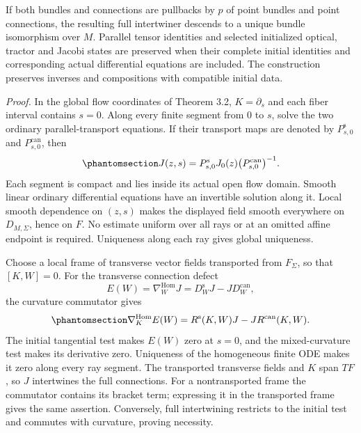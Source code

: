 \documentclass[
  english,
  11pt,
  reqno]{amsart}
\begin{document}
If both bundles and connections are pullbacks by \(p\) of point bundles
and point connections, the resulting full intertwiner descends to a
unique bundle isomorphism over \(M\). Parallel tensor identities and
selected initialized optical, tractor and Jacobi states are preserved
when their complete initial identities and corresponding actual
differential equations are included. The construction preserves inverses
and compositions with compatible initial data.

\emph{Proof.} In the global flow coordinates of Theorem 3.2,
\(K=\partial_s\) and each fiber interval contains \(s=0\). Along every
finite segment from \(0\) to \(s\), solve the two ordinary
parallel-transport equations. If their transport maps are denoted by
\(P^{\mathrm{s}}_{s,0}\) and \(P^{\mathrm{can}}_{s,0}\), then
\begin{equation}\protect\phantomsection\label{eq:global-finite-rank-transport-formula}{
J(z,s)=P^{\mathrm{s}}_{s,0}J_0(z)
\bigl(P^{\mathrm{can}}_{s,0}\bigr)^{-1}.
}\end{equation} Each segment is compact and lies inside its actual open
flow domain. Smooth linear ordinary differential equations have an
invertible solution along it. Local smooth dependence on \((z,s)\) makes
the displayed field smooth everywhere on \(D_{M,\Sigma}\), hence on
\(F\). No estimate uniform over all rays or at an omitted affine
endpoint is required. Uniqueness along each ray gives global uniqueness.

Choose a local frame of transverse vector fields transported from
\(F_\Sigma\), so that \([K,W]=0\). For the transverse connection defect
\[
E(W)=\nabla_W^{\operatorname{Hom}}J
=D_W^{\mathrm{s}}J-JD_W^{\mathrm{can}},
\] the curvature commutator gives
\begin{equation}\protect\phantomsection\label{eq:global-finite-rank-defect}{
\nabla_K^{\operatorname{Hom}}E(W)
=R^{\mathrm{s}}(K,W)J-JR^{\mathrm{can}}(K,W).
}\end{equation} The initial tangential test makes \(E(W)\) zero at
\(s=0\), and the mixed-curvature test makes its derivative zero.
Uniqueness of the homogeneous finite ODE makes it zero along every ray
segment. The transported transverse fields and \(K\) span \(TF\), so
\(J\) intertwines the full connections. For a nontransported frame the
commutator contains its bracket term; expressing it in the transported
frame gives the same assertion. Conversely, full intertwining restricts
to the initial test and commutes with curvature, proving necessity.
\end{document}
